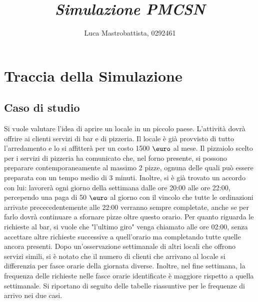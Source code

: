 \documentclass[a4paper, 12pt]{article}
\begin{document}
\title{
    \textbf{    
        \emph{Simulazione PMCSN}
    }
}
\author{Luca Mastrobattista, 0292461}
\date{} %
\maketitle  



\tableofcontents

\newpage
\section{Traccia della Simulazione}
\subsection{Caso di studio}
Si vuole valutare l'idea di aprire un locale in un piccolo paese. L'attività
dovrà offrire ai clienti servizi di bar e di pizzeria. Il locale è già
provvisto di tutto l'arredamento e lo si affitterà per un costo 1500 $\mbox{\euro}$ al mese.
Il pizzaiolo scelto per i servizi di pizzeria ha comunicato che, nel
forno presente, si possono preparare contemporaneamente al massimo 2 pizze,
ognuna delle quali può essere preparata con un tempo medio di 3 minuti.
Inoltre, si è già trovato un accordo con lui: lavorerà ogni giorno della
settimana dalle ore 20:00 alle ore 22:00, percependo una paga di
50 $\mbox{\euro}$ al giorno con il vincolo che tutte le ordinazioni arrivate prececedentemente alle 22:00 
verranno sempre completate, anche se per farlo dovrà continuare a sfornare
pizze oltre questo orario. Per quanto riguarda le richieste al bar, si vuole
che "l'ultimo giro" venga chiamato alle ore 02:00, senza accettare altre
richieste successive a quell'orario ma completando tutte quelle ancora
presenti. \newline
Dopo un'osservazione settimanale di altri locali che offrono servizi simili, si
è notato che il numero di clienti che arrivano al locale si differenzia per
fasce orarie della giornata diverse. Inoltre, nel fine settimana, la frequenza
delle richieste nelle fasce orarie identificate è maggiore rispetto a quella
settimanale. Si riportano di seguito delle tabelle riassuntive per le frequenze
di arrivo nei due casi.
\end{document}
